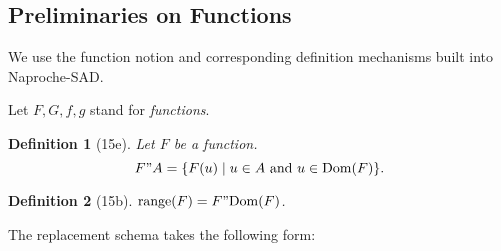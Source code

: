 \documentclass{article}
\newenvironment{forthel}{\begin{leftbar}}{\end{leftbar}}
\newtheorem{definition}{Definition}
\begin{document}
\subsection{Preliminaries on Functions}

We use the function notion and corresponding definition mechanisms
built into Naproche-SAD.
\begin{forthel}
Let $F,G,f,g$ stand for \emph{functions}.

\begin{definition}[15e] Let $F$ be a function.
$$F"A = \{F(u)\mid u \in A \text{ and } u \in \mathrm{Dom}(F)\}.$$
\end{definition}

\begin{definition}[15b] $\mathrm{range}(F) = F " \mathrm{Dom}(F)$.
\end{definition}
\end{forthel}

The replacement schema takes the following form:
\end{document}
